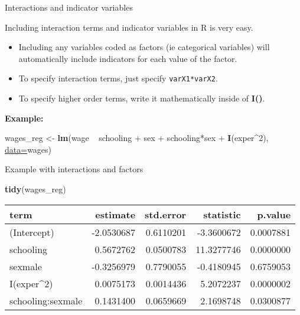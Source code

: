 \documentclass[ignorenonframetext,]{beamer}
\newenvironment{Shaded}{\begin{snugshade}}{\end{snugshade}}
\newcommand{\KeywordTok}[1]{\textcolor[rgb]{0.26,0.66,0.93}{\textbf{#1}}}
\newcommand{\DataTypeTok}[1]{\textcolor[rgb]{0.74,0.68,0.62}{\underline{#1}}}
\newcommand{\DecValTok}[1]{\textcolor[rgb]{0.27,0.67,0.26}{#1}}
\newcommand{\StringTok}[1]{\textcolor[rgb]{0.02,0.61,0.04}{#1}}
\newcommand{\OperatorTok}[1]{\textcolor[rgb]{0.74,0.68,0.62}{#1}}
\newcommand{\NormalTok}[1]{\textcolor[rgb]{0.74,0.68,0.62}{#1}}
\begin{document}
\begin{frame}[fragile]{Interactions and indicator variables}

Including interaction terms and indicator variables in R is very easy.

\begin{itemize}
\item
  Including any variables coded as factors (ie categorical variables)
  will automatically include indicators for each value of the factor.
\item
  To specify interaction terms, just specify \texttt{varX1*varX2}.
\item
  To specify higher order terms, write it mathematically inside of
  \textbf{I()}.
\end{itemize}

\textbf{Example:}

\begin{Shaded}
\begin{Highlighting}[]
\NormalTok{wages_reg <-}\StringTok{ }\KeywordTok{lm}\NormalTok{(wage }\OperatorTok{~}\StringTok{ }\NormalTok{schooling }\OperatorTok{+}\StringTok{ }\NormalTok{sex }\OperatorTok{+}\StringTok{ }
\StringTok{          }\NormalTok{schooling}\OperatorTok{*}\NormalTok{sex }\OperatorTok{+}\StringTok{ }\KeywordTok{I}\NormalTok{(exper}\OperatorTok{^}\DecValTok{2}\NormalTok{), }\DataTypeTok{data=}\NormalTok{wages)}
\end{Highlighting}
\end{Shaded}

\end{frame}

\begin{frame}[fragile]{Example with interactions and factors}

\begin{Shaded}
\begin{Highlighting}[]
\KeywordTok{tidy}\NormalTok{(wages_reg)}
\end{Highlighting}
\end{Shaded}

\begin{longtable}[]{@{}lrrrr@{}}
\toprule
term & estimate & std.error & statistic & p.value\tabularnewline
\midrule
\endhead
(Intercept) & -2.0530687 & 0.6110201 & -3.3600672 &
0.0007881\tabularnewline
schooling & 0.5672762 & 0.0500783 & 11.3277746 &
0.0000000\tabularnewline
sexmale & -0.3256979 & 0.7790055 & -0.4180945 & 0.6759053\tabularnewline
I(exper\^{}2) & 0.0075173 & 0.0014436 & 5.2072237 &
0.0000002\tabularnewline
schooling:sexmale & 0.1431400 & 0.0659669 & 2.1698748 &
0.0300877\tabularnewline
\bottomrule
\end{longtable}

\end{frame}
\end{document}
